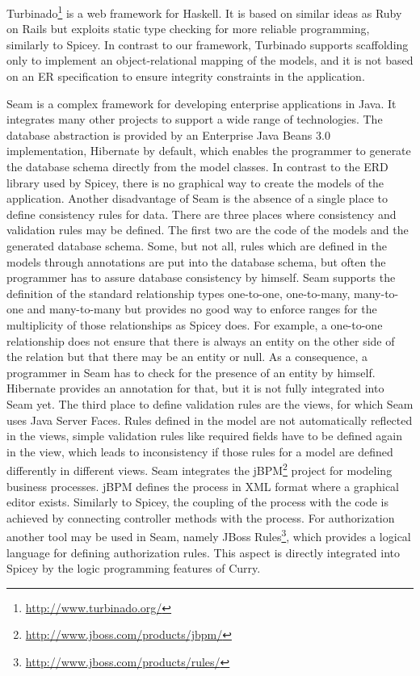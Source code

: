 \documentclass{tlp}
\renewcommand{\tt}{\usefont{OT1}{cmtt}{m}{n}\selectfont}
\begin{document}
Turbinado\footnote{\tt\url{http://www.turbinado.org/}}
is a web framework for Haskell. It is based on similar ideas
as Ruby on Rails but exploits static type checking for
more reliable programming, similarly to Spicey.
In contrast to our framework, Turbinado supports scaffolding only
to implement an object-relational mapping of the models,
and it is not based on an ER specification to ensure
integrity constraints in the application.

Seam \cite{YuanOrshalickHeute09}
is a complex framework for developing enterprise applications in Java. It
integrates many other projects to support a wide range of technologies. The
database abstraction is provided by an Enterprise Java Beans 3.0 implementation,
Hibernate by default, which enables the programmer to generate the
database schema directly from the model classes. In contrast to the ERD library
used by Spicey, there is no graphical way to create the models of the
application. Another disadvantage of Seam is the absence of a
single place to define consistency rules for data. There are three
places where consistency and validation rules may be defined.
The first two are the code of the models and the generated database schema.
Some, but not all, rules which are defined in the models through annotations are
put into the database schema, but often the programmer has to assure database
consistency by himself.
Seam supports the definition of the standard relationship types one-to-one,
one-to-many, many-to-one and many-to-many but provides no good way to enforce
ranges for the multiplicity of those relationships as Spicey does.
For example, a one-to-one relationship does not ensure
that there is always an entity on the other side of the relation
but that there may be an entity or null. As a consequence, a programmer
in Seam has to check for the presence of an entity by himself.
Hibernate provides an annotation for that,
but it is not fully integrated into Seam yet. 
The third place to define validation rules are the views,
for which Seam uses Java Server Faces.
Rules defined in the model are not automatically reflected in the views, simple
validation rules like required fields have to be defined again in the view,
which leads to inconsistency if those rules for a model are defined differently
in different views. Seam integrates the
jBPM\footnote{\tt\url{http://www.jboss.com/products/jbpm/}} project for modeling
business processes. jBPM defines the process in XML format where a
graphical editor exists.
Similarly to Spicey, the coupling of the process with the code is achieved by
connecting controller methods with the process. For
authorization another tool may be used in Seam, namely JBoss
Rules\footnote{\tt\url{http://www.jboss.com/products/rules/}}, which
provides a logical language for defining authorization rules.
This aspect is directly integrated into Spicey by the logic programming
features of Curry.
\end{document}
